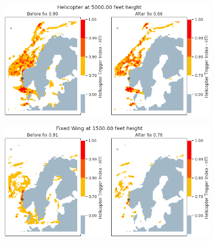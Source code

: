 \begin{figure}[H]
    \begin{subfigure}{0.45\textwidth}
    \centering
    \includegraphics[width = \textwidth]{Figures/02.png}
    \caption{}
    \label{fig:HTI02}
    \end{subfigure}
\hfill
    \begin{subfigure}{0.45\textwidth}
    \centering
    \includegraphics[width=\textwidth]{Figures/04.png}
    \caption{}
    \label{fig:HTI04}
    \end{subfigure}


\end{figure}
